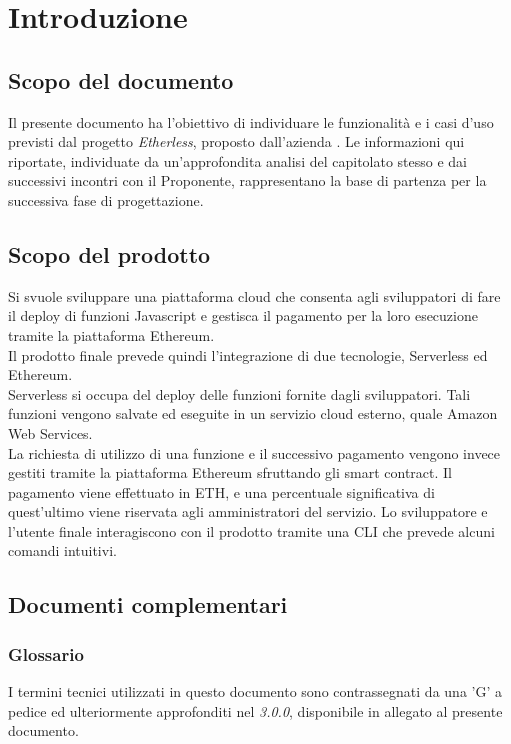 \section{Introduzione}
\subsection{Scopo del documento}
	Il presente documento ha l'obiettivo di individuare le funzionalità e i casi d'uso previsti dal progetto \textit{Etherless}, proposto dall'azienda \Proponente{}. Le informazioni qui riportate, individuate da un'approfondita analisi del capitolato stesso e dai successivi incontri con il Proponente, rappresentano la base di partenza per la successiva fase di progettazione.

\subsection{Scopo del prodotto}
	Si svuole sviluppare una piattaforma cloud che consenta agli sviluppatori di fare il deploy di funzioni Javascript e gestisca il pagamento per la loro esecuzione tramite la piattaforma Ethereum.\\
	Il prodotto finale prevede quindi l'integrazione di due tecnologie, Serverless ed Ethereum.\\
	Serverless si occupa del deploy delle funzioni fornite dagli sviluppatori. Tali funzioni vengono salvate ed eseguite in un servizio cloud esterno, quale Amazon Web Services.  \\La richiesta di utilizzo di una funzione e il successivo pagamento vengono invece gestiti tramite la piattaforma Ethereum sfruttando gli smart contract. Il pagamento viene effettuato in ETH, e una percentuale significativa di quest'ultimo viene riservata agli amministratori del servizio. 
	Lo sviluppatore e l'utente finale interagiscono con il prodotto tramite una CLI che prevede alcuni comandi intuitivi.

\subsection{Documenti complementari}
\subsubsection{Glossario}
	I termini tecnici utilizzati in questo documento sono contrassegnati da una ’G’ a pedice ed ulteriormente approfonditi nel \Glossario{} \textit{3.0.0}, disponibile in allegato al presente documento.

